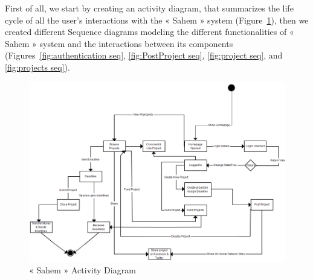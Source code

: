 First of all, we start by creating an activity diagram, that summarizes the life cycle of all the user's interactions with the « Sahem » system (Figure~\ref{fig:activity diagrma}), then we created different Sequence diagrams modeling the different functionalities of « Sahem » system and the interactions between its components (Figures~\ref{fig:authentication seq}, \ref{fig:PostProject seq}, \ref{fig:project seq}, and \ref{fig:projects seq}).

\begin{figure}[H]
      \center
      \includegraphics[scale=0.60]{assets/activity.png}
      \caption{« Sahem » Activity Diagram}
      \label{fig:activity diagrma}
\end{figure}

